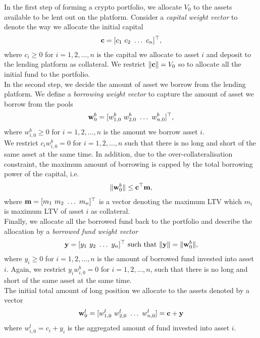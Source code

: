 \documentclass{article} %
\theoremstyle{plain}
\theoremstyle{definition} %
\begin{document}
In the first step of forming a crypto portfolio, we allocate $V_0$ to the assets available to be lent out on the platform. 
Consider a \textit{capital weight vector} to denote the way we allocate the initial capital
\begin{align*}
  {\bf c} = [c_1\ c_2\ \dots\ c_n]^\top,
\end{align*}
where $c_i \geq 0$ for $i=1,2,\dots,n$ is the capital we allocate to asset $i$ and deposit to the lending platform as collateral.
We restrict $\|{\bf c}\| = V_0$ so to allocate all the initial fund to the portfolio. \\

In the second step, we decide the amount of asset we borrow from the lending platform.
We define a \textit{borrowing weight vector} to capture the amount of asset we borrow from the pools
\begin{align*}
  {\bf w}^b_0 = [w_{1,0}^b\ w_{2,0}^b\ \dots\ w^b_{n,0}]^\top,
\end{align*}
where $w^b_{i,0} \geq 0$ for $i=1,2,\dots,n$ is the amount we borrow asset $i$. \\ 

We restrict $c_iw^b_{i,0} = 0$ for $i=1,2,\dots,n$ such that there is no long and short of the same asset at the same time.
In addition, due to the over-collateralisation constraint, the maximum amount of borrowing is capped by the total borrowing power of the capital, i.e.
 \begin{align*}
  \|{\bf w}^b_0\| \leq {\bf c}^\top {\bf m},
  \end{align*}
where ${\bf m} = [m_1\ m_2\ \dots\ m_n]^\top$ is a vector denoting the maximum LTV which $m_i$ is maximum LTV of asset $i$ as collateral. \\

Finally, we allocate all the borrowed fund back to the portfolio and describe the allocation by a \textit{borrowed fund weight vector}
\begin{align*}
  {\bf y} = [y_1\ y_2\ \dots\ y_n]^\top \text{ such that } \|{\bf y}\| = \|{\bf w}^b_0\|,
\end{align*}
where $y_i \geq 0$ for $i=1,2,\dots,n$ is the amount of borrowed fund invested into asset $i$.
Again, we restrict $y_iw^b_{i,0} = 0$ for $i=1,2,\dots,n$, such that there is no long and short of the same asset at the same time. \\

The initial total amount of long position we allocate to the assets denoted by a vector
\begin{align*}
  {\bf w}^l_0 =[w^l_{1,0}\ w^l_{2,0}\ \dots\ w^l_{n,0}] = {\bf c} + {\bf y}
  \end{align*}
where $w_{i,0}^l = c_i + y_i$ is the aggregated amount of fund invested into asset $i$.\\
\end{document}
